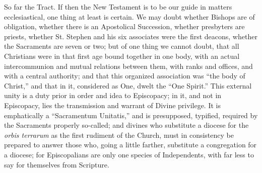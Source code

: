 So far the Tract. If then the New Testament is to be our guide in
matters ecclesiastical, one thing at least is certain. We may doubt
whether Bishops are of obligation, whether there is an Apostolical
Succession, whether presbyters are priests, whether St. Stephen and
his six associates were the first deacons, whether the Sacraments
are seven or two; but of one thing we cannot doubt, that all
Christians were in that first age bound together in one body, with an
actual intercommunion and mutual relations between them, with ranks
and offices, and with a central authority; and that this organized
association was ``the body of Christ,'' and that in it,
considered as One, dwelt the ``One Spirit.'' This external
unity is a duty prior in order and idea to Episcopacy; in it, and not
in Episcopacy, lies the transmission and warrant of Divine privilege.
It is emphatically a ``Sacramentum Unitatis,'' and is
presupposed, typified, required by the Sacraments properly so-called;
and divines who substitute a diocese for the \emph{orbis terrarum} as
the first rudiment of the Church, must in consistency be prepared to
answer those who, going a little farther, substitute a congregation
for a diocese; for Episcopalians are only one species of Independents,
with far less to say for themselves from Scripture.

